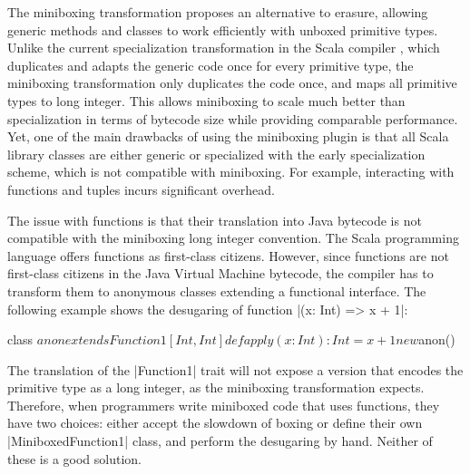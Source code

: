 The miniboxing transformation \cite{miniboxing} proposes an
alternative to erasure, allowing generic methods and classes to work
efficiently with unboxed primitive types. Unlike the current
specialization transformation in the Scala compiler
\cite{iuli-thesis}, which duplicates and adapts the generic code once
for every primitive type, the miniboxing transformation only
duplicates the code once, and maps all primitive types to
long integer. This allows miniboxing to scale much better than specialization
\cite{miniboxing-linkedlist} in terms of bytecode size while providing
comparable performance. Yet, one of the main drawbacks of using the
miniboxing plugin is that all Scala library classes are either generic
or specialized with the early specialization scheme, which is not
compatible with miniboxing. For example, interacting with functions and
tuples incurs significant overhead.

The issue with functions is that their translation into Java bytecode
is not compatible with the miniboxing long integer convention. The
Scala programming language offers functions as first-class
citizens. However, since functions are not first-class citizens in the
Java Virtual Machine bytecode, the compiler has to transform them to
anonymous classes extending a functional interface. The following
example shows the desugaring of function |(x: Int) => x + 1|:

\begin{lstlisting-nobreak}
class $anon extends Function1[Int, Int] {
  def apply(x: Int): Int = x + 1
}
new $anon()
\end{lstlisting-nobreak}

The translation of the |Function1| trait 
will not expose a version that encodes the primitive type as a long
integer, as the miniboxing transformation expects. Therefore, when
programmers write miniboxed code that uses functions, they have two
choices: either accept the slowdown of boxing or define their own
|MiniboxedFunction1| class, and perform the desugaring by
hand. Neither of these is a good solution.

